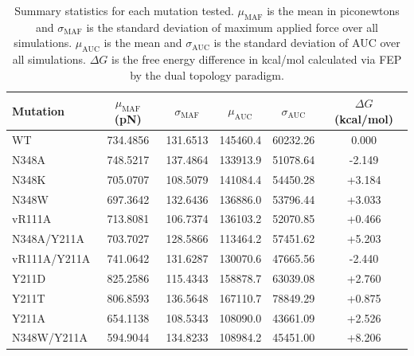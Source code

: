 \documentclass[12pt]{article}
\begin{document}
\clearpage
\begin {table}[H]
\caption{\label{tab:summary_statistics}Summary statistics for each mutation tested. $\mu_\text{MAF}$ is the mean in piconewtons and $\sigma_\text{MAF}$ is the standard deviation of maximum applied force over all simulations. $\mu_\text{AUC}$ is the mean and $\sigma_\text{AUC}$ is the standard deviation of AUC over all simulations. $\Delta G$ is the free energy difference in kcal/mol calculated via FEP by the dual topology paradigm.}
\begin{center}
  \resizebox{15cm}{!} {
    \begin{tabular}{l c c c c c}
    \hline
      Mutation & $\mu_\text{MAF}$ (pN) & $\sigma_\text{MAF}$ & $\mu_\text{AUC}$ & $\sigma_\text{AUC}$ & $\Delta G$ (kcal/mol)\\ \hline
            WT &                734.4856 &              131.6513 &         145460.4 &            60232.26 &  0.000\\
         N348A &                748.5217 &              137.4864 &         133913.9 &            51078.64 & -2.149\\
         N348K &                705.0707 &              108.5079 &         141084.4 &            54450.28 & +3.184\\
         N348W &                697.3642 &              132.6436 &         136886.0 &            53796.44 & +3.033\\
        vR111A &                713.8081 &              106.7374 &         136103.2 &            52070.85 & +0.466\\ 
   N348A/Y211A &                703.7027 &              128.5866 &         113464.2 &            57451.62 & +5.203\\ 
  vR111A/Y211A &                741.0642 &              131.6287 &         130070.6 &            47665.56 & -2.440\\
         Y211D &                825.2586 &              115.4343 &         158878.7 &            63039.08 & +2.760\\
         Y211T &                806.8593 &              136.5648 &         167110.7 &            78849.29 & +0.875\\
         Y211A &                654.1138 &              108.5343 &         108090.0 &            43661.09 & +2.526\\
   N348W/Y211A &                594.9044 &              134.8233 &         108984.2 &            45451.00 & +8.206\\
    \hline
    \end{tabular}
  }
\end{center}
\end{table}
\end{document}

